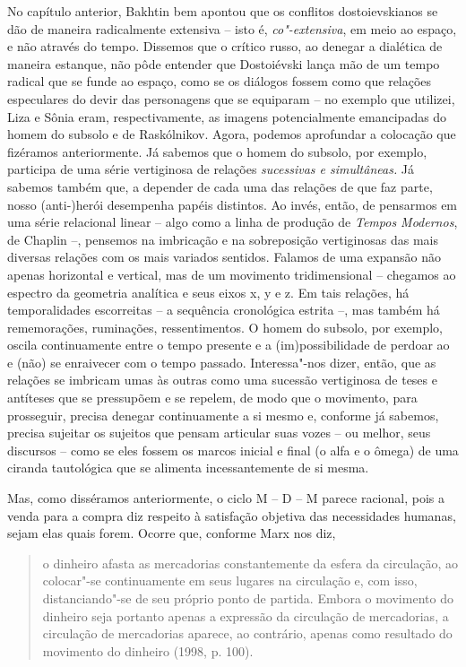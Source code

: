{No capítulo anterior, Bakhtin bem apontou que os conflitos
dostoievskianos se dão de maneira radicalmente extensiva -- isto é,
\emph{co"-extensiva}, em meio ao espaço, e não através do tempo. Dissemos
que o crítico russo, ao denegar a dialética de maneira estanque, não
pôde entender que Dostoiévski lança mão de um tempo radical que se funde
ao espaço, como se os diálogos fossem como que relações especulares do
devir das personagens que se equiparam -- no exemplo que utilizei, Liza
e Sônia eram, respectivamente, as imagens potencialmente emancipadas do
homem do subsolo e de Raskólnikov. Agora, podemos aprofundar a colocação
que fizéramos anteriormente. Já sabemos que o homem do subsolo, por
exemplo, participa de uma série vertiginosa de relações \emph{sucessivas
e simultâneas.} Já sabemos também que, a depender de cada uma das
relações de que faz parte, nosso (anti-)herói desempenha papéis
distintos. Ao invés, então, de pensarmos em uma série relacional linear
-- algo como a linha de produção de \emph{Tempos Modernos}, de Chaplin
--, pensemos na imbricação e na sobreposição vertiginosas das mais
diversas relações com os mais variados sentidos. Falamos de uma expansão
não apenas horizontal e vertical, mas de um movimento tridimensional --
chegamos ao espectro da geometria analítica e seus eixos x, y e z. Em
tais relações, há temporalidades escorreitas -- a sequência cronológica
estrita --, mas também há rememorações, ruminações, ressentimentos. O
homem do subsolo, por exemplo, oscila continuamente entre o tempo
presente e a (im)possibilidade de perdoar ao e (não) se enraivecer com o
tempo passado. Interessa"-nos dizer, então, que as relações se imbricam
umas às outras como uma sucessão vertiginosa de teses e antíteses que se
pressupõem e se repelem, de modo que o movimento, para prosseguir,
precisa denegar continuamente a si mesmo e, conforme já sabemos, precisa
sujeitar os sujeitos que pensam articular suas vozes -- ou melhor, seus
discursos -- como se eles fossem os marcos inicial e final (o alfa e o
ômega) de uma ciranda tautológica que se alimenta incessantemente de si
mesma.

Mas, como disséramos anteriormente, o ciclo M -- D -- M parece racional,
pois a venda para a compra diz respeito à satisfação objetiva das
necessidades humanas, sejam elas quais forem. Ocorre que, conforme Marx
nos diz,

\begin{quote}
o dinheiro afasta as mercadorias constantemente da esfera da circulação,
ao colocar"-se continuamente em seus lugares na circulação e, com isso,
distanciando"-se de seu próprio ponto de partida. Embora o movimento do
dinheiro seja portanto apenas a expressão da circulação de mercadorias,
a circulação de mercadorias aparece, ao contrário, apenas como resultado
do movimento do dinheiro (1998, p. 100).
\end{quote}

}
